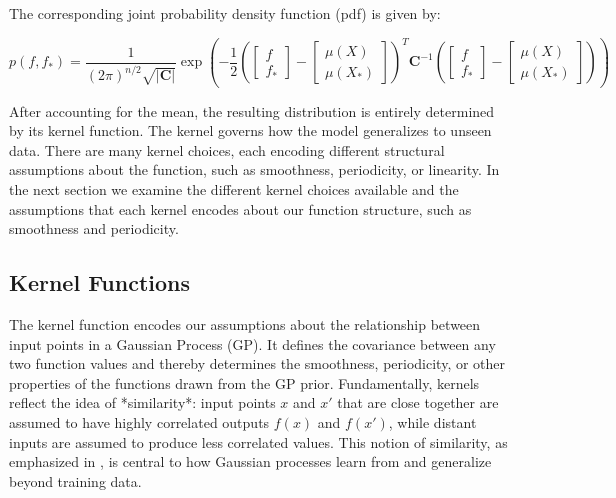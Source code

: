 \documentclass[11pt]{article}
\begin{document}
\noindent
The corresponding joint probability density function (pdf) is given by:

\begin{equation}
    p(f, f_*) = \frac{1}{(2\pi)^{n/2} \sqrt{|\mathbf{C}|}} \exp\left( 
    - \frac{1}{2}\left(\begin{bmatrix}f \\f_*\end{bmatrix}-
    \begin{bmatrix}\mu(X) \\\mu(X_*)\end{bmatrix}\right)^T
    \mathbf{C}^{-1}\left(
    \begin{bmatrix}f \\f_*\end{bmatrix}-
    \begin{bmatrix}\mu(X) \\\mu(X_*)\end{bmatrix}\right)\right)
\end{equation}
    

\noindent
After accounting for the mean, the resulting distribution is entirely determined by its kernel function.
The kernel governs how the model generalizes to unseen data. There are many kernel choices, each encoding different structural assumptions about the function, such as smoothness, periodicity, or linearity.
In the next section we examine the different kernel choices available and the assumptions that each kernel encodes about our function structure, such as smoothness and periodicity.



\subsection{Kernel Functions}
\label{sec: Kernels}
The kernel function encodes our assumptions about the relationship between input points in a Gaussian Process (GP).
It defines the covariance between any two function values and thereby determines the smoothness, periodicity, or other properties of the functions drawn from the GP prior.
Fundamentally, kernels reflect the idea of *similarity*: input points \( x \) and \( x' \) that are close together are assumed to have highly correlated outputs \( f(x) \) and \( f(x') \),
while distant inputs are assumed to produce less correlated values. This notion of similarity, as emphasized in \cite[p.~79]{bible}, is central to how Gaussian processes learn from and generalize beyond training data.
\end{document}

